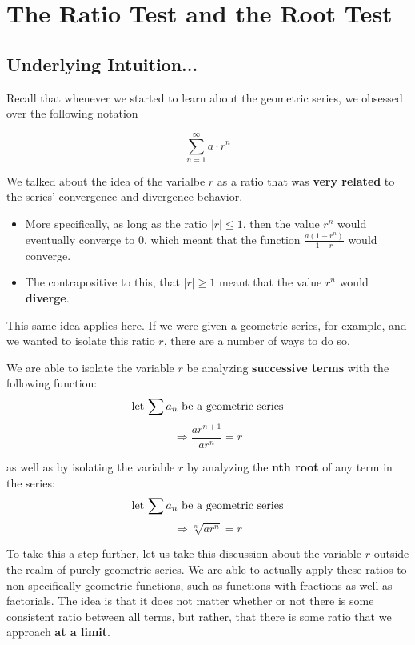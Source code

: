 \documentclass{report}
\begin{document}
\begin{sloppypar}
\begin{center}
{{    }
  }
\end{center}


\section{The Ratio Test and the Root Test}
\subsection{Underlying Intuition...}
Recall that whenever we started to learn about the geometric series,
we obsessed over the following notation

\[ \sum_{n=1}^{\infty} a \cdot r^{n} \]

We talked about the idea of the varialbe $ r $ as a ratio that was \textbf{very related}
to the series' convergence and divergence behavior.
\begin{itemize}
  \item More specifically, as long as the ratio $ | r | \leq 1 $, then the value $ r^{n} $ would
        eventually converge to 0, which meant that the function $ \frac{a(1-r^{n})}{1-r} $ would
        converge.
  \item The contrapositive to this, that $ | r | \geq 1 $ meant that the value $ r^{n} $ would
        \textbf{diverge}.
\end{itemize}

This same idea applies here. If we were given a geometric series, for example, and we
wanted to isolate this ratio $ r $, there are a number of ways to do so.

We are able to isolate the variable $ r $ be analyzing \textbf{successive terms} with
the following function:
\[ \textrm{let $ \sum a_{n}$ be a geometric series} \]
\[ \Rightarrow \frac{ar^{n+1}}{ar^{n}} = r \]

as well as by isolating the variable $ r $ by analyzing the \textbf{nth root} of any
term in the series:
\[ \textrm{let $ \sum a_{n}$ be a geometric series}\]
\[ \Rightarrow \sqrt[n]{ar^{n}} = r \]

To take this a step further, let us take this discussion
about the variable $ r $ outside the realm of purely
geometric series. We are able to actually apply these ratios
to non-specifically geometric functions, such as functions
with fractions as well as factorials. The idea is that it does
not matter whether or not there is some consistent ratio between
all terms, but rather, that there is some ratio that we approach
\textbf{at a limit}.


\end{sloppypar}
\end{document}
